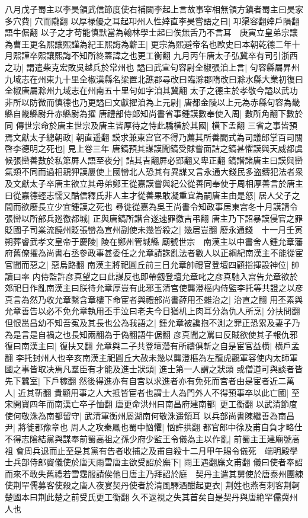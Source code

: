 八月戊子蜀主以李昊領武信節度使右補闕李起上言故事宰相無領方鎮者蜀主曰昊家多穴費|{
	穴而隴翻}
以厚禄優之耳起卭州人性婞直李昊嘗語之曰|{
	卭渠容翻婞戶隕翻語牛倨翻}
以子之才苟能慎默當為翰林學士起曰俟無舌乃不言耳　庚寅立皇弟宗讓為曹王更名熙讓熙謹為紀王熙誨為蘄王|{
	更宗為熙避帝名也歐史曰本朝乾德二年十月熙謹卒熙讓熙誨不知所終蓋諱之也更工衡翻}
九月丙午唐太子弘冀卒有司引浙西之功|{
	謂遣柴克宏敗吳越兵於常州也}
謚曰武宣句容尉全椒張洎上言|{
	句容縣屬昇州九域志在州東九十里全椒漢縣名梁置北譙郡尋改曰臨滁郡隋改曰滁水縣大業初復曰全椒唐屬滁州九域志在州南五十里句如字洎其冀翻}
太子之德主於孝敬今謚以武功非所以防微而慎德也乃更謚曰文獻擢洎為上元尉|{
	唐都金陵以上元為赤縣句容為畿縣自畿縣尉升赤縣尉為擢}
唐禮部侍郎知尚書省事鍾謨數奉使入周|{
	數所角翻下數於同}
傳世宗命於唐主世宗及唐主皆厚待之恃此驕横於其國|{
	横下孟翻}
三省之事皆預焉文獻太子總朝政|{
	朝直遥翻}
謨求兼東宫官不得乃薦其所善閻式為司議郎掌百司關啓李德明之死也|{
	見上卷三年}
唐鎬預其謀謨聞鎬受賕嘗面詰之鎬甚懼謨與天威都虞候張巒善數於私第屛人語至夜分|{
	詰其吉翻屛必郢翻又卑正翻}
鎬譖諸唐主曰謨與巒氣類不同而過相親狎謨屢使上國巒北人恐其有異謀又言永通大錢民多盗鑄犯法者衆及文獻太子卒唐主欲立其母弟鄭王從嘉謨嘗與紀公從善同奉使于周相厚善言於唐主曰從嘉德輕志懦又酷信釋氏非人主才從善果敢凝重宜為嗣唐主由是怒|{
	居人父子之間而欲廢長立少宜鍾謨之死也}
尋徙從嘉為吳王尚書令知政事居東宫冬十月謨請令張巒以所部兵廵徼都城|{
	正與唐鎬所譖合遂速罪徼吉弔翻}
唐主乃下詔暴謨侵官之罪貶國子司業流饒州貶張巒為宣州副使未幾皆殺之|{
	幾居豈翻}
廢永通錢　十一月壬寅朔葬睿武孝文皇帝于慶陵|{
	陵在鄭州管城縣}
廟號世宗　南漢主以中書舍人鍾允章藩府舊僚擢為尚書右丞參政事甚委任之允章請誅亂法者數人以正綱紀南漢主不能從宦官聞而惡之|{
	惡烏路翻}
南漢主將祀圓丘前三日允章帥禮官登壇四顧指揮設神位|{
	帥讀曰率}
内侍監許彦真望之曰此謀反也即帶劔登壇允章叱之彦真馳入宫告允章欲於郊祀日作亂南漢主曰朕待允章厚豈有此邪玉清宫使龔澄樞内侍監李托等共證之以彦真言為然乃收允章繫含章樓下命宦者與禮部尚書薛用丕雜治之|{
	治直之翻}
用丕素與允章善告以必不免允章執用丕手泣曰老夫今日猶机上肉耳分為仇人所烹|{
	分扶問翻}
但恨邕昌幼不知吾寃及其長也公為我語之|{
	鍾允章被讒抱不測之罪正恐累及妻子乃為是言是自禍之也長知兩翻為于偽翻語牛倨翻}
彦真聞之罵曰反賊欲使其子報仇邪復曰南漢主曰|{
	復扶又翻}
允章與二子共登壇濳有所禱俱斬之自是宦官益横|{
	横戶孟翻}
李托封州人也辛亥南漢主祀圓丘大赦未幾以龔澄樞為左龍虎觀軍容使内太師軍國之事皆取决焉凡羣臣有才能及進士狀頭|{
	進士第一人謂之狀頭}
或僧道可與談者皆先下蠶室|{
	下戶稼翻}
然後得進亦有自宫以求進者亦有免死而宫者由是宦者近二萬人|{
	近其靳翻}
貴顯用事之人大抵皆宦者也謂士人為門外人不得預事卒以此亡國|{
	至宋開寶四年而南漢亡卒子恤翻}
唐更命洪州曰南昌府建南都|{
	更工衡翻}
以武清節度使何敬洙為南都留守|{
	武清軍衡州屬湖南何敬洙遥領耳}
以兵部尚書陳繼善為南昌尹|{
	將徙都豫章也}
周人之攻秦鳳也蜀中忷懼|{
	忷許拱翻}
都官郎中徐及甫自負才略仕不得志隂結黨與謀奉前蜀高祖之孫少府少監王令儀為主以作亂|{
	前蜀主王建廟號高祖}
會周兵退而止至是其黨有告者收捕之及甫自殺十二月甲午賜令儀死　端明殿學士兵部侍郎竇儀使於唐天雨雪唐主欲受詔於廡下|{
	雨王遇翻廡文甫翻}
儀曰使者奉詔而來不敢失舊禮若雪霑服請俟他日唐主乃拜詔於庭　契丹主遣其舅使於唐泰州團練使荆罕儒募客使殺之唐人夜宴契丹使者於清風驛酒酣起更衣|{
	荆姓也燕有刺客荆軻楚國本曰荆此楚之前受氏更工衡翻}
久不返視之失其首矣自是契丹與唐絶罕儒冀州人也

